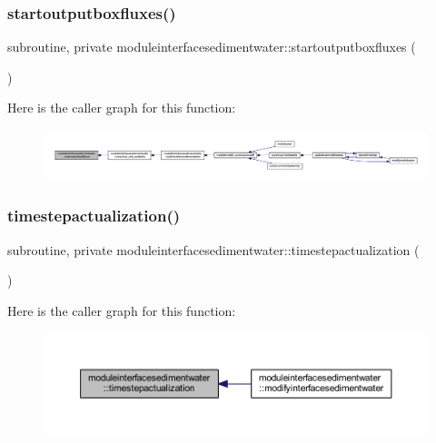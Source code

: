 \subsubsection{\texorpdfstring{startoutputboxfluxes()}{startoutputboxfluxes()}}
{\footnotesize\ttfamily subroutine, private moduleinterfacesedimentwater\+::startoutputboxfluxes (\begin{DoxyParamCaption}{ }\end{DoxyParamCaption})\hspace{0.3cm}{\ttfamily [private]}}

Here is the caller graph for this function\+:\nopagebreak
\begin{figure}[H]
\begin{center}
\leavevmode
\includegraphics[width=350pt]{namespacemoduleinterfacesedimentwater_af7fed6c8828bf29ad2aadce486e94d62_icgraph}
\end{center}
\end{figure}
\mbox{\label{namespacemoduleinterfacesedimentwater_acc1eb6dcb216d902e358a53eb7c1604d}} 
\subsubsection{\texorpdfstring{timestepactualization()}{timestepactualization()}}
{\footnotesize\ttfamily subroutine, private moduleinterfacesedimentwater\+::timestepactualization (\begin{DoxyParamCaption}{ }\end{DoxyParamCaption})\hspace{0.3cm}{\ttfamily [private]}}

Here is the caller graph for this function\+:\nopagebreak
\begin{figure}[H]
\begin{center}
\leavevmode
\includegraphics[width=350pt]{namespacemoduleinterfacesedimentwater_acc1eb6dcb216d902e358a53eb7c1604d_icgraph}
\end{center}
\end{figure}
\mbox{\label{namespacemoduleinterfacesedimentwater_a44d390c3a6dfc918b1ff6bc5261c39ec}} 
